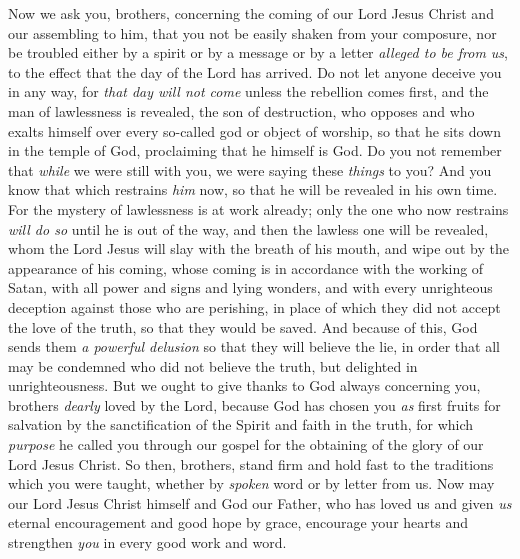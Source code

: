 \begin{biblechapter} %
 Now we ask you, brothers, concerning the coming of our Lord Jesus Christ and our assembling to him,
\verse that you not be easily shaken from your composure, nor be troubled either by a spirit or by a message or by a letter \textit{alleged to be from us}, to the effect that the day of the Lord has arrived.
\verse Do not let anyone deceive you in any way, for \textit{that day will not come} unless the rebellion comes first, and the man of lawlessness is revealed, the son of destruction,
\verse who opposes and who exalts himself over every so-called god or object of worship, so that he sits down in the temple of God, proclaiming that he himself is God.
\verse Do you not remember that \textit{while} we were still with you, we were saying these \textit{things} to you?
\verse And you know that which restrains \textit{him} now, so that he will be revealed in his own time.
\verse For the mystery of lawlessness is at work already; only the one who now restrains \textit{will do so} until he is out of the way,
\verse and then the lawless one will be revealed, whom the Lord Jesus will slay with the breath of his mouth, and wipe out by the appearance of his coming,
\verse whose coming is in accordance with the working of Satan, with all power and signs and lying wonders,
\verse and with every unrighteous deception against those who are perishing, in place of which they did not accept the love of the truth, so that they would be saved.
\verse And because of this, God sends them \textit{a powerful delusion} so that they will believe the lie,
\verse in order that all may be condemned who did not believe the truth, but delighted in unrighteousness.
 But we ought to give thanks to God always concerning you, brothers \textit{dearly} loved by the Lord, because God has chosen you \textit{as} first fruits for salvation by the sanctification of the Spirit and faith in the truth,
\verse for which \textit{purpose} he called you through our gospel for the obtaining of the glory of our Lord Jesus Christ.
\verse So then, brothers, stand firm and hold fast to the traditions which you were taught, whether by \textit{spoken} word or by letter from us.
\verse Now may our Lord Jesus Christ himself and God our Father, who has loved us and given \textit{us} eternal encouragement and good hope by grace,
\verse encourage your hearts and strengthen \textit{you} in every good work and word.
\end{biblechapter}

